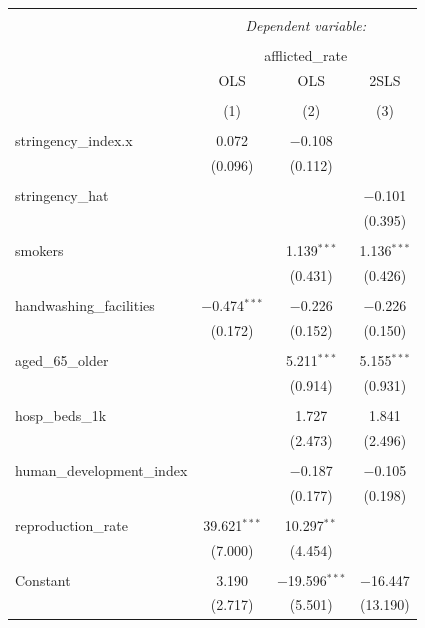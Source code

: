 \documentclass[11pt,preprint, authoryear]{elsarticle}
\let\origtable\table
\let\endorigtable\endtable
\renewenvironment{table}[1][2] {
    \expandafter\origtable\expandafter[H]
} {
    \endorigtable
}
\numberwithin{equation}{section}
\numberwithin{figure}{section}
\numberwithin{table}{section}
\begin{document}
\begin{table}[!htbp] \centering 
  \caption{} 
  \label{} 
\footnotesize 
\begin{tabular}{@{\extracolsep{5pt}}lccc} 
\\[-1.8ex]\hline 
\hline \\[-1.8ex] 
 & \multicolumn{3}{c}{\textit{Dependent variable:}} \\ 
\cline{2-4} 
\\[-1.8ex] & \multicolumn{3}{c}{afflicted\_rate} \\ 
 & OLS & OLS & 2SLS \\ 
\\[-1.8ex] & (1) & (2) & (3)\\ 
\hline \\[-1.8ex] 
 stringency\_index.x & 0.072 & $-$0.108 &  \\ 
  & (0.096) & (0.112) &  \\ 
  & & & \\ 
 stringency\_hat &  &  & $-$0.101 \\ 
  &  &  & (0.395) \\ 
  & & & \\ 
 smokers &  & 1.139$^{***}$ & 1.136$^{***}$ \\ 
  &  & (0.431) & (0.426) \\ 
  & & & \\ 
 handwashing\_facilities & $-$0.474$^{***}$ & $-$0.226 & $-$0.226 \\ 
  & (0.172) & (0.152) & (0.150) \\ 
  & & & \\ 
 aged\_65\_older &  & 5.211$^{***}$ & 5.155$^{***}$ \\ 
  &  & (0.914) & (0.931) \\ 
  & & & \\ 
 hosp\_beds\_1k &  & 1.727 & 1.841 \\ 
  &  & (2.473) & (2.496) \\ 
  & & & \\ 
 human\_development\_index &  & $-$0.187 & $-$0.105 \\ 
  &  & (0.177) & (0.198) \\ 
  & & & \\ 
 reproduction\_rate & 39.621$^{***}$ & 10.297$^{**}$ &  \\ 
  & (7.000) & (4.454) &  \\ 
  & & & \\ 
 Constant & 3.190 & $-$19.596$^{***}$ & $-$16.447 \\ 
  & (2.717) & (5.501) & (13.190) \\ 

\end{tabular}
\end{table}
\end{document}
